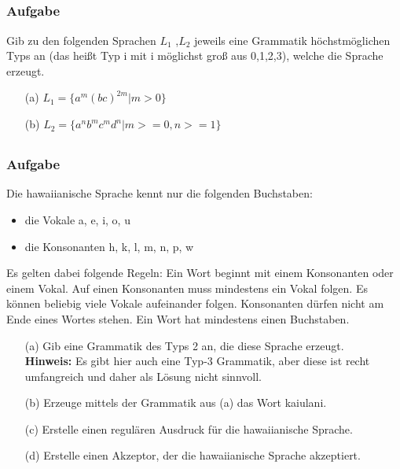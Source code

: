 \subsection*{}
\begin{frame}
	\frametitle{Aufgabe}
	Gib zu den folgenden Sprachen $L_1$ ,$L_2$ jeweils eine Grammatik höchstmöglichen Typs 	an (das heißt Typ i mit i möglichst groß aus {0,1,2,3}), welche die Sprache erzeugt.
	\begin{enumerate}
		\item[(a)] $L_1=\{a^m (bc)^{2m}| m> 0 \}$
		\item[(b)] $L_2=\{a^n b^m c^m d^n | m>=0, n>=1 \}$
	\end{enumerate}
\end{frame}

\subsection*{}
\begin{frame}
	\frametitle{Aufgabe}
	Die hawaiianische Sprache kennt nur die folgenden Buchstaben:
	\begin{itemize}
		\item die Vokale a, e, i, o, u
		\item die Konsonanten h, k, l, m, n, p, w
	\end{itemize}
Es gelten dabei folgende Regeln:
Ein Wort beginnt mit einem Konsonanten oder einem Vokal. Auf einen Konsonanten muss
mindestens ein Vokal folgen. Es können beliebig viele Vokale aufeinander folgen. Konsonanten
dürfen nicht am Ende eines Wortes stehen. Ein Wort hat mindestens einen Buchstaben.
	\small
	\begin{enumerate}
		\item[(a)] Gib eine Grammatik des Typs 2 an, die diese Sprache erzeugt. \\
					\footnotesize
					\textbf{Hinweis:} Es gibt hier auch eine Typ-3 Grammatik, aber diese ist recht umfangreich und daher als Lösung nicht sinnvoll.
					\small
		\item[(b)] Erzeuge mittels der Grammatik aus (a) das Wort kaiulani.
		\item[(c)] Erstelle einen regulären Ausdruck für die hawaiianische Sprache.
		\item[(d)] Erstelle einen Akzeptor, der die hawaiianische Sprache akzeptiert.
	\end{enumerate}
\end{frame}

